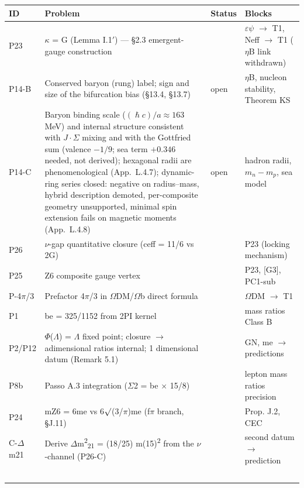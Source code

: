 \documentclass[11pt,letterpaper]{article}
\begin{document}
\begin{footnotesize}\begin{longtable}{|>{\raggedright\arraybackslash}p{}|>{\raggedright\arraybackslash}p{}|>{\raggedright\arraybackslash}p{}|>{\raggedright\arraybackslash}p{}|}
\hline
\textbf{ID} & \textbf{Problem} & \textbf{Status} & \textbf{Blocks} \\ \hline
P23 & $\kappa$ = G (Lemma I.1$'$) --- §2.3 emergent-gauge construction & [T2+] & $\varepsilon$$\psi$ $\to$ T1, Neff $\to$ T1 ($\eta$B link withdrawn) \\ \hline
P14-B & Conserved baryon (rung) label; sign and size of the bifurcation bias (§13.4, §13.7) & open & $\eta$B, nucleon stability, Theorem KS \\ \hline
P14-C & Baryon binding scale ($(\hslash c)/a\approx163$ MeV) and internal structure consistent with $J\!\cdot\!\Sigma$ mixing and with the Gottfried sum (valence $-1/9$; sea term $+0.346$ needed, not derived); hexagonal radii are phenomenological (App.~L.4.7); dynamic-ring series closed: negative on radius--mass, hybrid description demoted, per-composite geometry unsupported, minimal spin extension fails on magnetic moments (App.~L.4.8) & open & hadron radii, $m_n-m_p$, sea model \\ \hline
P26 & $\nu$-gap quantitative closure (ceff = 11/6 vs 2G) & [T2] & P23 (locking mechanism) \\ \hline
P25 & Z6 composite gauge vertex & [T2] & P23, [G3], PC1-sub \\ \hline
P-4$\pi$/3 & Prefactor 4$\pi$/3 in $\Omega$DM/$\Omega$b direct formula & [T2+] & $\Omega$DM $\to$ T1 \\ \hline
P1 & be = 325/1152 from 2PI kernel & [T2] & mass ratios Class B \\ \hline
P2/P12 & $\Phi$($\Lambda$) = $\Lambda$ fixed point; closure $\to$ adimensional ratios internal; 1 dimensional datum (Remark 5.1) & [T2] & GN, me $\to$ predictions \\ \hline
P8b & Passo A.3 integration ($\Sigma$2 = be $\times$ 15/8) & [T2] & lepton mass ratios precision \\ \hline
P24 & mZ6 = 6me vs 6$\surd$(3/$\pi$)me (f$\pi$ branch, §J.11) & [T2] & Prop. J.2, CEC \\ \hline
C-$\Delta$m21 & Derive $\Delta$m\textsuperscript{2}\textsubscript{21} = (18/25) m(15)\textsuperscript{2} from the $\nu$-channel (P26-C) & [T4] & second datum $\to$ prediction \\ \hline
$$
\end{longtable}
\end{footnotesize}
\end{document}

